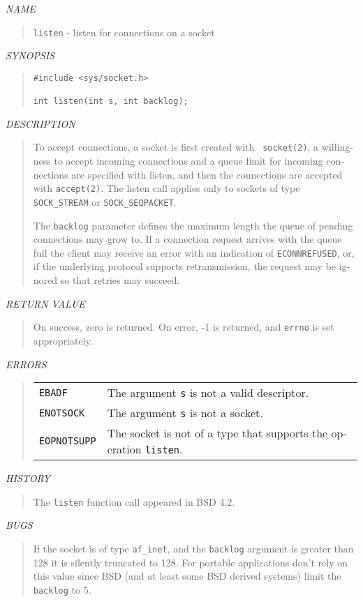 \begin{appendix}
\begin{english}
{\sl NAME}
\begin{quote}
	{\tt listen} - listen for connections on a socket
\end{quote}

{\sl SYNOPSIS}
\begin{quote}
\begin{verbatim}
#include <sys/socket.h>

int listen(int s, int backlog);
\end{verbatim}
\end{quote}

{\sl DESCRIPTION}
\begin{quote}
	To accept connections, a socket is first created with {\tt
	socket(2)}, a willingness to accept incoming connections and a 
	queue limit for incoming connections are specified with listen, and
	then the connections are accepted with {\tt accept(2)}. The 
	listen call applies only to sockets of type {\tt SOCK\_STREAM} or
	{\tt SOCK\_SEQPACKET}.

	The {\tt backlog} parameter defines the maximum length the queue of 
	pending connections may grow to. If a connection request
	arrives with the queue full the client may receive an error with 
	an indication of {\tt ECONNREFUSED}, or, if the underlying protocol
	supports retransmission, the request may be ignored so that
	retries may succeed.
\end{quote}

{\sl RETURN VALUE}
\begin{quote}
	On success, zero is returned. On error, -1 is returned,
	and {\tt errno} is set appropriately.
\end{quote}

{\sl ERRORS}
\begin{quote}
\begin{tabular}{lp{8cm}}
	{\tt EBADF}			& The argument {\tt s} is not a valid descriptor.\\
	{\tt ENOTSOCK}		& The argument {\tt s} is not a socket.\\
	{\tt EOPNOTSUPP}	& The socket is not of a type that supports the
						  operation {\tt listen}.
\end{tabular}
\end{quote}

{\sl HISTORY}
\begin{quote}
	The {\tt listen} function call appeared in BSD 4.2.
\end{quote}

{\sl BUGS}
\begin{quote}
	If the socket is of type {\tt af\_inet}, and the {\tt backlog}
	argument is greater than 128 it is silently truncated to  128.  For
	portable  applications  don't rely on this value since BSD (and at
	least some BSD derived systems) limit the  {\tt backlog} to 5.
\end{quote}


\end{english}
\end{appendix}

